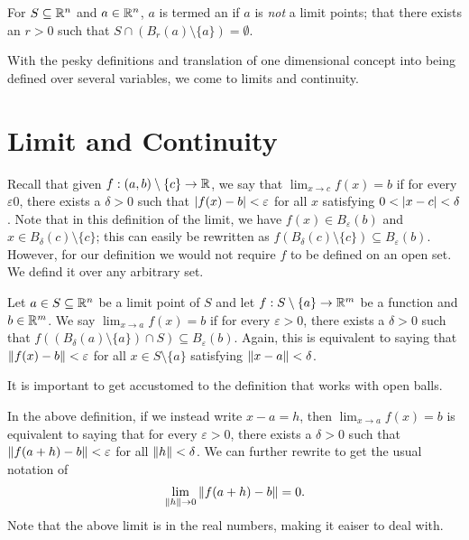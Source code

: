\begin{definition}
    For $S \subseteq \mathbb{R}^{n}$ and $a \in \mathbb{R}^{n}$, $a$ is termed an  if $a$ is \textit{not} a limit points; that there exists an $r > 0$ such that $S \cap (B_{r}(a) \setminus \{a\}) = \emptyset$.
\end{definition}

With the pesky definitions and translation of one dimensional concept into being defined over several variables, we come to limits and continuity.

\section{Limit and Continuity}
Recall that given $f:(a,b)\setminus\{c\} \to \mathbb{R}$, we say that $\lim_{x \to c}f(x) = b$ if for every $\varepsilon  0$, there exists a $\delta > 0$ such that $\left| f(x)-b \right| < \varepsilon$ for all $x$ satisfying $0 < \left| x-c \right| < \delta$. Note that in this definition of the limit, we have $f(x) \in B_{\varepsilon}(b)$ and $x \in B_{\delta}(c) \setminus \{c\}$; this can easily be rewritten as $f(B_{\delta}(c)\setminus\{c\}) \subseteq B_{\varepsilon}(b)$. However, for our definition we would not require $f$ to be defined on an open set. We defind it over any arbitrary set.

\begin{definition}
    Let $a \in S \subseteq \mathbb{R}^{n}$ be a limit point of $S$ and let $f:S\setminus\{a\} \to \mathbb{R}^{m}$ be a function and $b \in \mathbb{R}^{m}$. We say $\lim_{x \to a} f(x) = b$ if for every $\varepsilon > 0$, there exists a $\delta > 0$ such that $f((B_{\delta}(a)\setminus\{a\}) \cap S) \subseteq B_{\varepsilon}(b)$. Again, this is equivalent to saying that $\left\lVert f(x)-b\right\rVert < \varepsilon$ for all $x \in S\setminus\{a\}$ satisfying $\left\lVert x-a\right\rVert < \delta$.
\end{definition}

It is important to get accustomed to the definition that works with open balls.
\begin{remark}
    In the above definition, if we instead write $x - a = h$, then $\lim_{x \to a} f(x) = b$ is equivalent to saying that for every $\varepsilon > 0$, there exists a $\delta > 0$ such that $\left\lVert f(a+h)-b\right\rVert < \varepsilon$ for all $\left\lVert h\right\rVert < \delta$. We can further rewrite to get the usual notation of
    \begin{align}
        \lim_{\left\lVert h\right\rVert \to 0} \left\lVert f(a+h)-b\right\rVert = 0.
    \end{align}
    Note that the above limit is in the real numbers, making it eaiser to deal with.
\end{remark}

